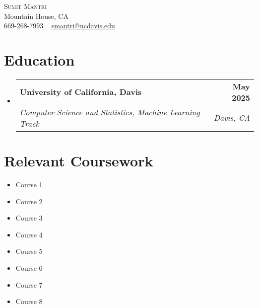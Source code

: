 \documentclass[letterpaper,11pt]{article}
\makeatletter
\newcommand{\resumeSubheading}[4]{
  \vspace{-2pt}\item
  \begin{tabular*}{1.0\textwidth}[t]{l@{\extracolsep{\fill}}r}
    \textbf{#1} & \textbf{\small #2} \\
    \textit{\small#3} & \textit{\small #4} \\
  \end{tabular*}\vspace{-7pt}
}
\newcommand{\resumeSubHeadingListStart}{\begin{itemize}[leftmargin=0.0in, label={}]}
\newcommand{\resumeSubHeadingListEnd}{\end{itemize}}
\makeatother
\begin{document}
\begin{center}
    {\Huge \scshape Sumit Mantri} \\[1pt]
    Mountain House, CA \\[1pt]
    \small 669-268-7993 ~ \href{mailto:smantri@ucdavis.edu}{smantri@ucdavis.edu} ~ 
\end{center}

\section{Education}
\resumeSubHeadingListStart
  \resumeSubheading
    {University of California, Davis}{May 2025}
    {Computer Science and Statistics, Machine Learning Track}{Davis, CA}
\resumeSubHeadingListEnd

\section{Relevant Coursework}
\begin{multicols}{4}
    \begin{itemize}[itemsep=-5pt, parsep=3pt]
        \item Course 1
        \item Course 2
        \item Course 3
        \item Course 4
        \item Course 5
        \item Course 6
        \item Course 7
        \item Course 8
    \end{itemize}
\end{multicols}

\end{document}
